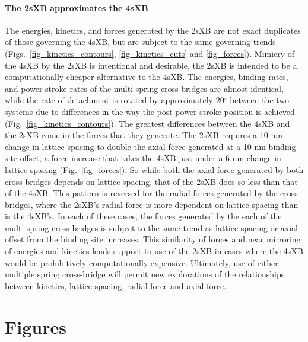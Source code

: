 \documentclass[]{article}
\begin{document}
\paragraph{The 2sXB approximates the 4sXB} %
The energies, kinetics, and forces generated by the 2sXB are not exact duplicates of those governing the 4sXB, but are subject to the same governing trends (Figs.~\ref{fig_kinetics_contours}, \ref{fig_kinetics_cuts} and \ref{fig_forces}). 
Mimicry of the 4sXB by the 2sXB is intentional and desirable, the 2sXB is intended to be a computationally cheaper alternative to the 4sXB\@. 
The energies, binding rates, and power stroke rates of the multi-spring cross-bridges are almost identical, while the rate of detachment is rotated by approximately 20$^\circ$ between the two systems due to differences in the way the post-power stroke position is achieved (Fig.~\ref{fig_kinetics_contours}).
The greatest differences between the 4sXB and the 2sXB come in the forces that they generate.
The 2sXB requires a 10 nm change in lattice spacing to double the axial force generated at a 10 nm binding site offset, a force increase that takes the 4sXB just under a 6 nm change in lattice spacing (Fig.~\ref{fig_forces}). 
So while both the axial force generated by both cross-bridges depends on lattice spacing, that of the 2sXB does so less than that of the 4sXB\@.
This pattern is reversed for the radial forces generated by the cross-bridges, where the 2sXB's radial force is more dependent on lattice spacing than is the 4sXB's.
In each of these cases, the forces generated by the each of the multi-spring cross-bridges is subject to the same trend as lattice spacing or axial offset from the binding site increases.
This similarity of forces and near mirroring of energies and kinetics lends support to use of the 2sXB in cases where the 4sXB would be prohibitively computationally expensive.
Ultimately, use of either multiple spring cross-bridge will permit new explorations of the relationships between kinetics, lattice spacing, radial force and axial force.



\clearpage
\section*{Figures} %
\end{document}
